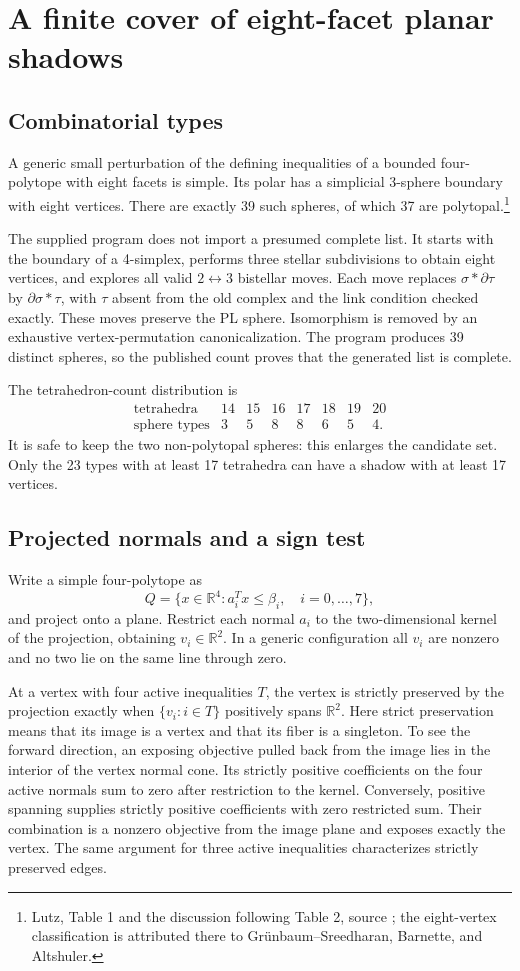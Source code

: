 \documentclass[11pt]{article}
\theoremstyle{definition}
\newcommand{\R}{\mathbb R}
\begin{document}
\section{A finite cover of eight-facet planar shadows}
\subsection{Combinatorial types}
A generic small perturbation of the defining inequalities of a bounded four-polytope with eight facets is simple. Its polar has a simplicial 3-sphere boundary with eight vertices. There are exactly 39 such spheres, of which 37 are polytopal.\footnote{Lutz, Table 1 and the discussion following Table 2, source \cite{lutz}; the eight-vertex classification is attributed there to Gr\"unbaum--Sreedharan, Barnette, and Altshuler.}

The supplied program does not import a presumed complete list. It starts with the boundary of a 4-simplex, performs three stellar subdivisions to obtain eight vertices, and explores all valid $2\leftrightarrow3$ bistellar moves. Each move replaces $\sigma*\partial\tau$ by $\partial\sigma*\tau$, with $\tau$ absent from the old complex and the link condition checked exactly. These moves preserve the PL sphere. Isomorphism is removed by an exhaustive vertex-permutation canonicalization. The program produces 39 distinct spheres, so the published count proves that the generated list is complete.

The tetrahedron-count distribution is
\[
\begin{array}{c|rrrrrrr}
 \text{tetrahedra}&14&15&16&17&18&19&20\\\hline
 \text{sphere types}&3&5&8&8&6&5&4.
\end{array}
\]
It is safe to keep the two non-polytopal spheres: this enlarges the candidate set. Only the 23 types with at least 17 tetrahedra can have a shadow with at least 17 vertices.

\subsection{Projected normals and a sign test}
Write a simple four-polytope as
\[
 Q=\{x\in\R^4:a_i^Tx\le\beta_i,\quad i=0,\ldots,7\},
\]
and project onto a plane. Restrict each normal $a_i$ to the two-dimensional kernel of the projection, obtaining $v_i\in\R^2$. In a generic configuration all $v_i$ are nonzero and no two lie on the same line through zero.

At a vertex with four active inequalities $T$, the vertex is strictly preserved by the projection exactly when $\{v_i:i\in T\}$ positively spans $\R^2$. Here strict preservation means that its image is a vertex and that its fiber is a singleton. To see the forward direction, an exposing objective pulled back from the image lies in the interior of the vertex normal cone. Its strictly positive coefficients on the four active normals sum to zero after restriction to the kernel. Conversely, positive spanning supplies strictly positive coefficients with zero restricted sum. Their combination is a nonzero objective from the image plane and exposes exactly the vertex. The same argument for three active inequalities characterizes strictly preserved edges.
\end{document}
